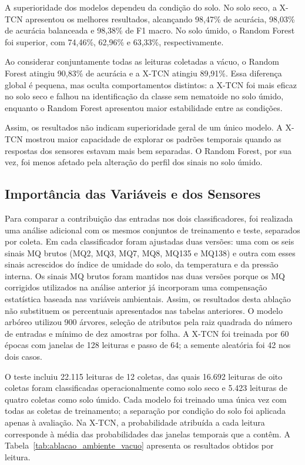 A superioridade dos modelos dependeu da condição do solo. No solo seco, a
X-TCN apresentou os melhores resultados, alcançando 98,47\% de acurácia,
98,03\% de acurácia balanceada e 98,38\% de F1 macro. No solo úmido, o Random
Forest foi superior, com 74,46\%, 62,96\% e 63,33\%, respectivamente.

Ao considerar conjuntamente todas as leituras coletadas a vácuo, o Random
Forest atingiu 90,83\% de acurácia e a X-TCN atingiu 89,91\%. Essa diferença
global é pequena, mas oculta comportamentos distintos: a X-TCN foi mais eficaz
no solo seco e falhou na identificação da classe sem nematoide no solo úmido,
enquanto o Random Forest apresentou maior estabilidade entre as condições.

Assim, os resultados não indicam superioridade geral de um único modelo. A
X-TCN mostrou maior capacidade de explorar os padrões temporais quando as
respostas dos sensores estavam mais bem separadas. O Random Forest, por sua
vez, foi menos afetado pela alteração do perfil dos sinais no solo úmido.

\subsection{Importância das Variáveis e dos Sensores}


Para comparar a contribuição das entradas nos dois classificadores, foi
realizada uma análise adicional com os mesmos conjuntos de treinamento e teste,
separados por coleta. Em cada classificador foram ajustadas duas versões: uma
com os seis sinais MQ brutos (MQ2, MQ3, MQ7, MQ8, MQ135 e MQ138) e outra com
esses sinais acrescidos do índice de umidade do solo, da temperatura e da
pressão interna. Os sinais MQ brutos foram mantidos nas duas versões porque os
MQ corrigidos utilizados na análise anterior já incorporam uma compensação
estatística baseada nas variáveis ambientais. Assim, os resultados desta
ablação não substituem os percentuais apresentados nas tabelas anteriores.
O modelo arbóreo utilizou 900 árvores, seleção de atributos pela raiz
quadrada do número de entradas e mínimo de dez amostras por folha. A X-TCN
foi treinada por 60 épocas com janelas de 128 leituras e passo de 64; a
semente aleatória foi 42 nos dois casos.

O teste incluiu 22.115 leituras de 12 coletas, das quais 16.692 leituras de
oito coletas foram classificadas operacionalmente como solo seco e 5.423
leituras de quatro coletas como solo úmido. Cada modelo foi treinado uma única
vez com todas as coletas de treinamento; a separação por condição do solo foi
aplicada apenas à avaliação. Na X-TCN, a probabilidade atribuída a cada
leitura corresponde à média das probabilidades das janelas temporais que a
contêm. A Tabela~\ref{tab:ablacao_ambiente_vacuo} apresenta os resultados
obtidos por leitura.

